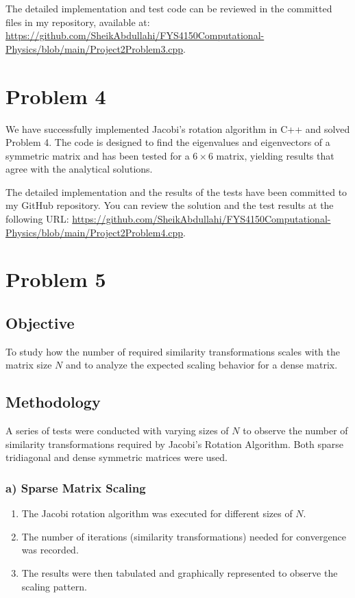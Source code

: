 \documentclass{article}
\begin{document}
The detailed implementation and test code can be reviewed in the committed files in my repository, available at: \url{https://github.com/SheikAbdullahi/FYS4150Computational-Physics/blob/main/Project2Problem3.cpp}.

\section*{Problem 4}

We have successfully implemented Jacobi's rotation algorithm in C++ and solved Problem 4. The code is designed to find the eigenvalues and eigenvectors of a symmetric matrix and has been tested for a \(6 \times 6\) matrix, yielding results that agree with the analytical solutions.

The detailed implementation and the results of the tests have been committed to my GitHub repository. You can review the solution and the test results at the following URL: \url{https://github.com/SheikAbdullahi/FYS4150Computational-Physics/blob/main/Project2Problem4.cpp}.

\section*{Problem 5}


\subsection*{Objective}
To study how the number of required similarity transformations scales with the matrix size \( N \) and to analyze the expected scaling behavior for a dense matrix.

\subsection*{Methodology}
A series of tests were conducted with varying sizes of \( N \) to observe the number of similarity transformations required by Jacobi's Rotation Algorithm. Both sparse tridiagonal and dense symmetric matrices were used.

\subsubsection*{a) Sparse Matrix Scaling}
\begin{enumerate}
    \item The Jacobi rotation algorithm was executed for different sizes of \( N \).
    \item The number of iterations (similarity transformations) needed for convergence was recorded.
    \item The results were then tabulated and graphically represented to observe the scaling pattern.
\end{enumerate}
\end{document}
